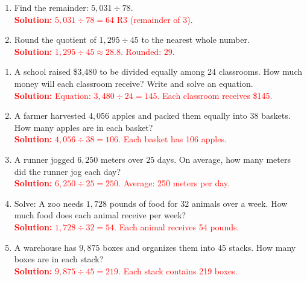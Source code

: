\documentclass[12pt]{article}
\begin{document}
\begin{tcolorbox}[colframe=black!60, colback=white, 
coltitle=black, colbacktitle=black!15, fonttitle=\bfseries\Large, 
title=Exercises, halign title=center, left=10pt, right=10pt, top=10pt, bottom=60pt]
\begin{enumerate}[itemsep=3em]
    \item Find the remainder: \( 5,031 \div 78 \).\\
    \textcolor{red}{\textbf{Solution:} \( 5,031 \div 78 = 64 \) R3 (remainder of 3).}

    \item Round the quotient of \( 1,295 \div 45 \) to the nearest whole number.\\
    \textcolor{red}{\textbf{Solution:} \( 1,295 \div 45 \approx 28.8 \). Rounded: \( 29 \).}
\end{enumerate}
\end{tcolorbox}

\begin{tcolorbox}[colframe=black!60, colback=white, 
coltitle=black, colbacktitle=black!15, fonttitle=\bfseries\Large, 
title=Problems, halign title=center, left=10pt, right=10pt, top=10pt, bottom=60pt]
\begin{enumerate}[start=9, itemsep=3em]

    \item A school raised \$3,480 to be divided equally among 24 classrooms. How much money will each classroom receive? Write and solve an equation.\\
    \textcolor{red}{\textbf{Solution:} Equation: \( 3,480 \div 24 = 145 \). Each classroom receives \$145.}

    \item A farmer harvested \( 4,056 \) apples and packed them equally into \( 38 \) baskets. How many apples are in each basket?\\
    \textcolor{red}{\textbf{Solution:} \( 4,056 \div 38 = 106 \). Each basket has 106 apples.}

    \item A runner jogged \( 6,250 \) meters over \( 25 \) days. On average, how many meters did the runner jog each day?\\
    \textcolor{red}{\textbf{Solution:} \( 6,250 \div 25 = 250 \). Average: 250 meters per day.}

    \item Solve: A zoo needs \( 1,728 \) pounds of food for \( 32 \) animals over a week. How much food does each animal receive per week?\\
    \textcolor{red}{\textbf{Solution:} \( 1,728 \div 32 = 54 \). Each animal receives 54 pounds.}

    \item A warehouse has \( 9,875 \) boxes and organizes them into \( 45 \) stacks. How many boxes are in each stack?\\
    \textcolor{red}{\textbf{Solution:} \( 9,875 \div 45 = 219 \). Each stack contains 219 boxes.}


\end{enumerate}
\end{tcolorbox}
\end{document}
